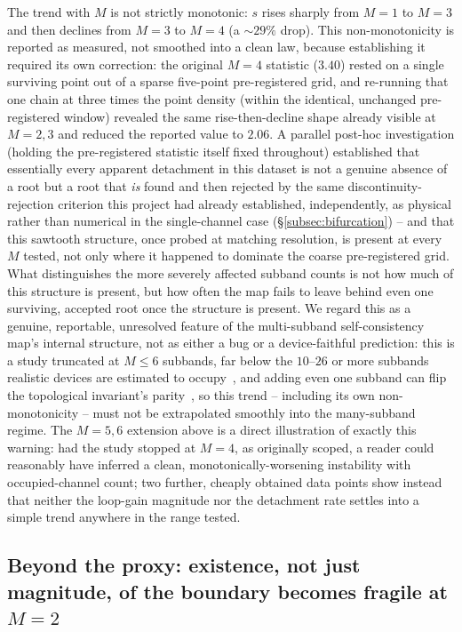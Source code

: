 \documentclass[aps,physrev,reprint,superscriptaddress,amsmath,amssymb,floatfix]{revtex4-2}
\begin{document}
The trend with $M$ is not strictly monotonic: $s$ rises sharply from
$M=1$ to $M=3$ and then declines from $M=3$ to $M=4$ (a $\sim29\%$ drop).
This non-monotonicity is reported as measured, not smoothed into a clean
law, because establishing it required its own correction: the original $M=4$
statistic ($3.40$) rested on a single surviving point out of a sparse
five-point pre-registered grid, and re-running that one chain at three
times the point density (within the identical, unchanged pre-registered
window) revealed the same rise-then-decline shape already visible at
$M=2,3$ and reduced the reported value to $2.06$. A parallel post-hoc
investigation (holding the pre-registered statistic itself fixed
throughout) established that essentially every apparent detachment in
this dataset is not a genuine absence of a root but a root that
\emph{is} found and then rejected by the same discontinuity-rejection
criterion this project had already established, independently, as
physical rather than numerical in the single-channel case
(\S\ref{subsec:bifurcation}) -- and that this sawtooth structure, once probed
at matching resolution, is present at every $M$ tested, not only where it
happened to dominate the coarse pre-registered grid. What distinguishes
the more severely affected subband counts is not how much of this
structure is present, but how often the map fails to leave behind even
one surviving, accepted root once the structure is present. We regard
this as a genuine, reportable, unresolved feature of the multi-subband
self-consistency map's internal structure, not as either a bug or a
device-faithful prediction: this is a study truncated at $M\leq6$
subbands, far below the $10$--$26$ or more subbands realistic devices are
estimated to occupy~\cite{woods2020}, and adding even one subband can
flip the topological invariant's parity~\cite{lim2012}, so this trend --
including its own non-monotonicity -- must not be extrapolated smoothly
into the many-subband regime. The $M=5,6$ extension above is a direct
illustration of exactly this warning: had the study stopped at $M=4$, as
originally scoped, a reader could reasonably have inferred a clean,
monotonically-worsening instability with occupied-channel count; two
further, cheaply obtained data points show instead that neither the
loop-gain magnitude nor the detachment rate settles into a simple trend
anywhere in the range tested.

\FloatBarrier
\subsection{Beyond the proxy: existence, not just magnitude, of the boundary becomes fragile at $M=2$}
\label{subsec:existence}
\end{document}
